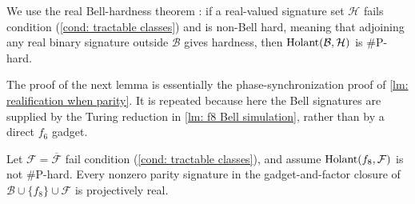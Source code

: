 We use the real Bell-hardness theorem
\cite[Theorem~7.19]{realholant}: if a real-valued signature set
$\mathcal H$ fails condition \rm{(\ref{cond: tractable classes})} and is
non-Bell hard, meaning that adjoining any real binary signature outside
$\mathcal B$ gives hardness, then
$\operatorname{Holant}(\mathcal B,\mathcal H)$ is \#P-hard.

The proof of the next lemma is essentially the phase-synchronization proof
of \cref{lm: realification when parity}.  It is repeated because here the
Bell signatures are supplied by the Turing reduction in
\cref{lm: f8 Bell simulation}, rather than by a direct $f_6$ gadget.

\begin{lemma}
\label{lm: f8 parity realification}
Let $\mathcal F=\overline{\mathcal F}$ fail condition
\rm{(\ref{cond: tractable classes})}, and assume
$\operatorname{Holant}(f_8,\mathcal F)$ is not \#P-hard.  Every nonzero parity
signature in the gadget-and-factor closure of
$\mathcal B\cup\{f_8\}\cup\mathcal F$ is projectively real.
\end{lemma}

